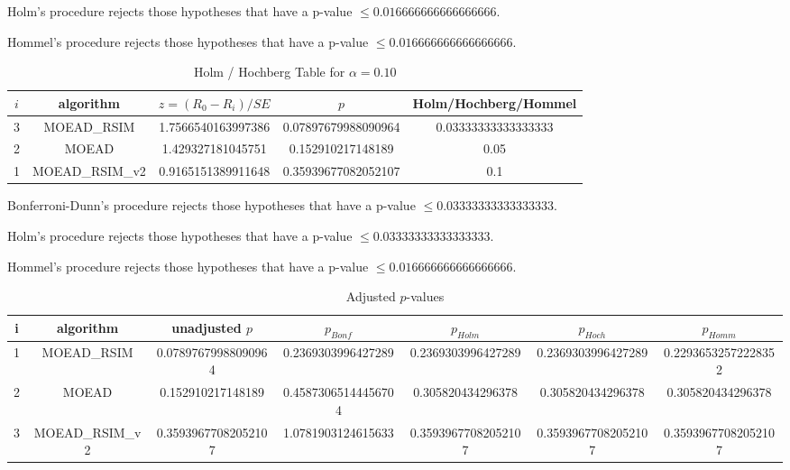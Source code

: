 \documentclass[a4paper,10pt]{article}
\begin{document}
\begin{landscape}
Holm's procedure rejects those hypotheses that have a p-value $\le0.016666666666666666$.


Hommel's procedure rejects those hypotheses that have a p-value $\le0.016666666666666666$.


\begin{table}[!htp]
\centering\tiny
\caption{Holm / Hochberg Table for $\alpha=0.10$}
\begin{tabular}{ccccc}
$i$&algorithm&$z=(R_0 - R_i)/SE$&$p$&Holm/Hochberg/Hommel\\
\hline
3&MOEAD_RSIM&1.7566540163997386&0.07897679988090964&0.03333333333333333\\
2&MOEAD&1.429327181045751&0.152910217148189&0.05\\
1&MOEAD_RSIM_v2&0.9165151389911648&0.35939677082052107&0.1\\
\hline
\end{tabular}
\end{table}
Bonferroni-Dunn's procedure rejects those hypotheses that have a p-value $\le0.03333333333333333$.


Holm's procedure rejects those hypotheses that have a p-value $\le0.03333333333333333$.


Hommel's procedure rejects those hypotheses that have a p-value $\le0.016666666666666666$.


\begin{table}[!htp]
\centering\tiny
\caption{Adjusted $p$-values}
\begin{tabular}{ccccccc}
i&algorithm&unadjusted $p$&$p_{Bonf}$&$p_{Holm}$&$p_{Hoch}$&$p_{Homm}$\\
\hline
1&MOEAD_RSIM&0.07897679988090964&0.2369303996427289&0.2369303996427289&0.2369303996427289&0.22936532572228352\\
2&MOEAD&0.152910217148189&0.45873065144456704&0.305820434296378&0.305820434296378&0.305820434296378\\
3&MOEAD_RSIM_v2&0.35939677082052107&1.0781903124615633&0.35939677082052107&0.35939677082052107&0.35939677082052107\\
\hline
\end{tabular}
\end{table}


\end{landscape}
\end{document}
